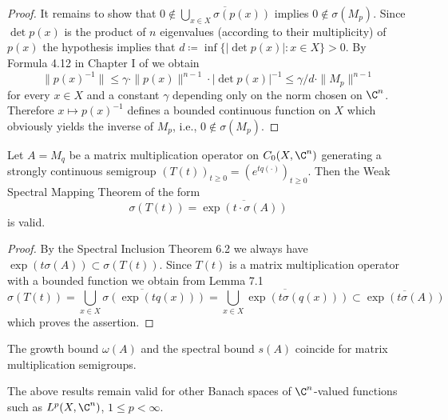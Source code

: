 \begin{proof}
It remains to show that $0 \notin \overline{\bigcup_{x\in X} \sigma(p(x))}$ implies $0 \notin \sigma(M_{p})$.
Since $\det p(x)$ is the product of $n$ eigenvalues (according to their multiplicity) of $p(x)$ the hypothesis implies that $d \coloneqq \inf\{|\det p(x)| \colon x \in X\} > 0$.
By Formula 4.12 in Chapter I of \citet{kato:1966} we obtain
\[
\|p(x)^{-1}\| \leq \gamma \cdot \|p(x)\|^{n-1} \cdot |\det p(x)|^{-1} \leq \gamma/d \cdot \|M_{p}\|^{n-1}
\]
for every $x \in X$ and a constant $\gamma$ depending only on the norm chosen on $\C^{n}$.
Therefore $x \mapsto p(x)^{-1}$ defines a bounded continuous function on $X$ which obviously yields the inverse of $M_{p}$, i.e., $0 \notin \sigma(M_{p})$.
\end{proof}

\begin{theorem}\label{thm:a3-7.2}
Let $A = M_{q}$ be a matrix multiplication operator on $C_{0}(X,\C^{n})$ generating a strongly continuous semigroup $(T(t))_{t\geq 0} = (e^{tq(\cdot)})_{t\geq 0}$.
Then the Weak Spectral Mapping Theorem of the form
\begin{equation}\label{eq:a3-7.2}
\sigma(T(t)) = \overline{\exp(t\cdot\sigma(A))}
\end{equation}
is valid.
\end{theorem}

\begin{proof}
By the Spectral Inclusion Theorem 6.2 we always have $\exp(t\sigma(A)) \subset \sigma(T(t))$.
Since $T(t)$ is a matrix multiplication operator with a bounded function we obtain from Lemma 7.1
\[
\sigma(T(t)) = \overline{\bigcup_{x\in X} \sigma(\exp(tq(x)))} = \overline{\bigcup_{x\in X} \exp(t\sigma(q(x)))} \subset \overline{\exp(t\sigma(A))}
\]
which proves the assertion.
\end{proof}

\begin{corollary}\label{cor:a3-7.3}
The growth bound $\omega(A)$ and the spectral bound $s(A)$ coincide for matrix multiplication semigroups.
\end{corollary}

\begin{remark}
The above results remain valid for other Banach spaces of $\C^{n}$-valued functions such as $L^{p}(X,\C^{n})$, $1 \leq p < \infty$.
\end{remark}

